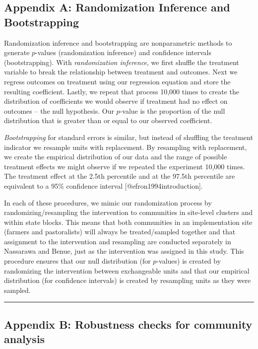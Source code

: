 \documentclass[
]{article}
\begin{document}
\hypertarget{appendix-a-randomization-inference-and-bootstrapping}{%
\subsection{Appendix A: Randomization Inference and
Bootstrapping}\label{appendix-a-randomization-inference-and-bootstrapping}}

Randomization inference and bootstrapping are nonparametric methods to
generate \(p\)-values (randomization inference) and confidence intervals
(bootstrapping). With \emph{randomization inference}, we first shuffle
the treatment variable to break the relationship between treatment and
outcomes. Next we regress outcomes on treatment using our regression
equation and store the resulting coefficient. Lastly, we repeat that
process 10,000 times to create the distribution of coefficients we would
observe if treatment had no effect on outcomes -- the null hypothesis.
Our \(p\)-value is the proportion of the null distribution that is
greater than or equal to our observed coefficient.

\emph{Bootstrapping} for standard errors is similar, but instead of
shuffling the treatment indicator we resample units with replacement. By
resampling with replacement, we create the empirical distribution of our
data and the range of possible treatment effects we might observe if we
repeated the experiment 10,000 times. The treatment effect at the 2.5th
percentile and at the 97.5th percentile are equivalent to a 95\%
confidence interval {[}@efron1994introduction{]}.

In each of these procedures, we mimic our randomization process by
randomizing/resampling the intervention to communities in site-level
clusters and within state blocks. This means that both communities in an
implementation site (farmers and pastoralists) will always be
treated/sampled together and that assignment to the intervention and
resampling are conducted separately in Nassarawa and Benue, just as the
intervention was assigned in this study. This procedure ensures that our
null distribution (for \(p\)-values) is created by randomizing the
intervention between exchangeable units and that our empirical
distribution (for confidence intervals) is created by resampling units
as they were sampled.

\begin{center}\rule{0.5\linewidth}{0.5pt}\end{center}

\hypertarget{appendix-b-robustness-checks-for-community-analysis}{%
\subsection{Appendix B: Robustness checks for community
analysis}\label{appendix-b-robustness-checks-for-community-analysis}}
\end{document}
